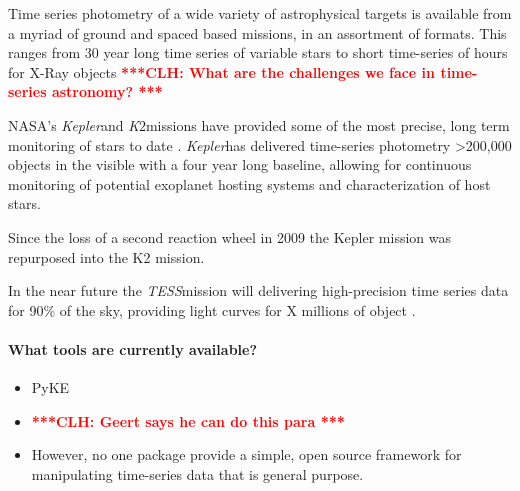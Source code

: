 \documentclass[twocolumn]{aastex62}
\newcommand{\ktwo}{{\it K$\mathit{2}$}}
\newcommand{\tess}{{\it TESS}}
\newcommand{\kepler}{{\it Kepler}}
\newcommand{\clh}[1]{\textcolor{red}{ \textbf{***CLH: #1 ***}}}
\begin{document}
Time series photometry of a wide variety of astrophysical targets is available from a myriad of ground and spaced based missions, in an assortment of formats. This ranges from 30 year long time series of variable stars\cite{citationneeded} to short time-series of hours for X-Ray objects 
\clh{What are the challenges we face in time-series astronomy?}

NASA's \kepler and \ktwo missions have provided some of the most precise, long term monitoring of stars to date \cite{citationneeded}. \kepler has delivered time-series photometry >200,000 objects in the visible with a four year long baseline, allowing for continuous monitoring of potential exoplanet hosting systems and characterization of host stars. 

Since the loss of a second reaction wheel in 2009 the Kepler mission was repurposed into the K2 mission.

In the near future the \tess mission will delivering high-precision time series data for 90\% of the sky, providing light curves for X millions of object \cite{citationneeded}.


\paragraph{What tools are currently available?}
\begin{itemize}
\item PyKE
\item \clh{Geert says he can do this para}
\item However, no one package provide a simple, open source framework for manipulating time-series data that is general purpose.
\end{itemize}
\end{document}
